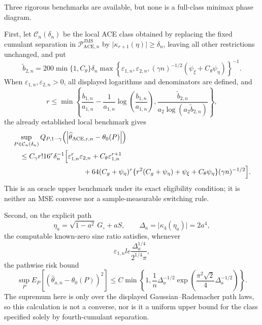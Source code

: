 Three rigorous benchmarks are available, but none is a full-class minimax phase diagram.

First, let \(\mathcal C_n(\delta_n)\) be the local ACE class obtained by replacing the fixed cumulant separation in \(\mathcal P_{\mathrm{ACE},n}^{\mathrm{JMS}}\) by \(\lvert\kappa_{r+1}(\eta)\rvert\ge\delta_n\), leaving all other restrictions unchanged, and put
\[
 \widetilde b_{2,n}
 =200\min\{1,C_{\theta}\}\delta_n
 \max\!\left\{
   \varepsilon_{1,n},\varepsilon_{2,n},
   (\gamma n)^{-1/2}(\psi_{\xi}+C_{\theta}\psi_{\eta})
 \right\}^{-1}.
\]
When \(\varepsilon_{1,n},\varepsilon_{2,n}>0\), all displayed logarithms and denominators are defined, and
\[
 r\le
 \min\!\left\{
   \frac{b_{1,n}}{a_{1,n}}
   -\frac{1}{a_{1,n}}\log\!\left(\frac{b_{1,n}}{a_{1,n}}\right),
   \frac{\widetilde b_{2,n}}{a_2\log(a_2\widetilde b_{2,n})}
 \right\},
\]
the already established local benchmark gives
\[
\begin{aligned}
 &\sup_{P\in\mathcal C_n(\delta_n)}
 Q_{P,1-\gamma}
 \!\left(\left|\widehat\theta_{\mathrm{ACE},r,n}-\theta_0(P)\right|\right)\\
 &\quad\le
 C_{\gamma}r!16^r\delta_n^{-1}
 \Bigl[
   \varepsilon_{1,n}^r\varepsilon_{2,n}
   +C_{\theta}\varepsilon_{1,n}^{r+1}\\
 &\hspace{35mm}
   +64(C_g+\psi_{\eta})^r
    \{r^2(C_g+\psi_{\eta})+\psi_{\xi}+C_{\theta}\psi_{\eta}\}
    (\gamma n)^{-1/2}
 \Bigr].
\end{aligned}
\]
This is an oracle upper benchmark under its exact eligibility condition; it is neither an MSE converse nor a sample-measurable switching rule.

Second, on the explicit path
\[
 \eta_a=\sqrt{1-a^2}\,G_{\circ}+aS,
 \qquad
 \Delta_a=\lvert\kappa_4(\eta_a)\rvert=2a^4,
\]
the computable known-zero sine ratio satisfies, whenever
\[
 \varepsilon_{1,n}le
 \frac{\Delta_a^{1/4}}{2^{1/4}\pi},
\]
the pathwise risk bound
\[
 \sup_P E_P[(\widehat\theta_{a,n}-\theta_0(P))^2]
 \le
 C\min\!\left\{
  1,
  \frac{1}{n}\Delta_a^{-1/2}
  \exp\!\left(\frac{\pi^2\sqrt2}{4}\Delta_a^{-1/2}\right)
 \right\}.
\]
The supremum here is only over the displayed Gaussian--Rademacher path laws, so this calculation is not a converse, nor is it a uniform upper bound for the class specified solely by fourth-cumulant separation.

